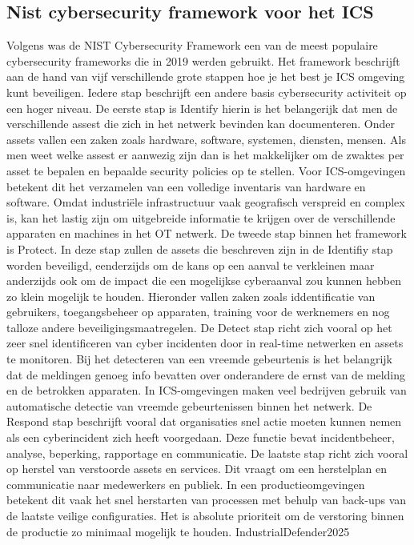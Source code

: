 \subsection{Nist cybersecurity framework voor het ICS}
Volgens \textcite{IndustrialDefender2025} was de NIST Cybersecurity Framework een van de meest populaire cybersecurity frameworks die in 2019 werden gebruikt. Het framework beschrijft aan de hand van vijf verschillende grote stappen hoe je het best je ICS omgeving kunt beveiligen. Iedere stap beschrijft een andere basis cybersecurity activiteit op een hoger niveau.
De eerste stap is Identify hierin is het belangerijk dat men de verschillende assest die zich in het netwerk bevinden kan documenteren. Onder assets vallen een zaken zoals hardware, software, systemen, diensten, mensen. Als men weet welke assest er aanwezig zijn dan is het makkelijker om de zwaktes per asset te bepalen en bepaalde security policies op te stellen. Voor ICS-omgevingen betekent dit het verzamelen van een volledige inventaris van hardware en software. Omdat industriële infrastructuur vaak geografisch verspreid en complex is, kan het lastig zijn om uitgebreide informatie te krijgen over de verschillende apparaten en machines in het OT netwerk. \autocite{Nist2024}
De tweede stap binnen het framework is Protect. In deze stap zullen de assets die beschreven zijn in de Identifiy stap worden beveiligd, eenderzijds om de kans op een aanval te verkleinen maar anderzijds ook om de impact die een mogelijkse cyberaanval zou kunnen hebben zo klein mogelijk te houden. Hieronder vallen zaken zoals iddentificatie van gebruikers, toegangsbeheer op apparaten, training voor de werknemers en nog talloze andere beveiligingsmaatregelen. \autocite{Nist2024}
De Detect stap richt zich vooral op het zeer snel identificeren van cyber incidenten door in real-time netwerken en assets te monitoren. Bij het detecteren van een vreemde gebeurtenis is het belangrijk dat de meldingen genoeg info bevatten over onderandere de ernst van de melding en de betrokken apparaten. In ICS-omgevingen maken veel bedrijven gebruik van automatische detectie van vreemde gebeurtenissen binnen het netwerk. \autocite{Nist2024}
De Respond stap beschrijft vooral dat organisaties snel actie moeten kunnen nemen als een cyberincident zich heeft voorgedaan. Deze functie bevat incidentbeheer, analyse, beperking, rapportage en communicatie. \autocite{Nist2024}
De laatste stap richt zich vooral op herstel van verstoorde assets en services. Dit vraagt om een herstelplan en communicatie naar medewerkers en publiek. In een productieomgevingen betekent dit vaak het snel herstarten van processen met behulp van back-ups van de laatste veilige configuraties. Het is absolute prioriteit om de verstoring binnen de productie zo minimaal mogelijk te houden. {IndustrialDefender2025}


